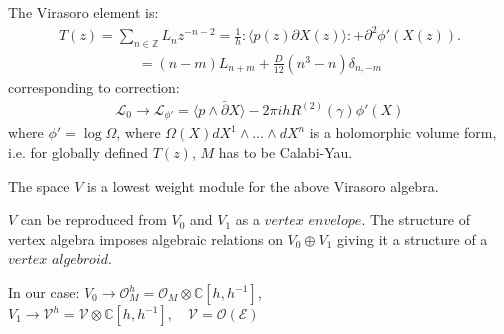 \documentclass[9pt]{beamer}
\newcommand{\p}{\partial}
\def\cE{\mathcal{E}}
\begin{document}
\begin{frame}
The Virasoro element is:
\begin{eqnarray*}
T(z)=\sum_{n\in \mathbb{Z}} L_n z^{-n-2}=\frac{1}{h}:\langle p(z)\p X(z)\rangle:+\p^2\phi'(X(z)).
\end{eqnarray*}
\begin{eqnarray*}
[L_n,L_m]=(n-m)L_{n+m}+\frac{D}{12}(n^3-n)\delta_{n,-m}
\end{eqnarray*}
 corresponding to correction:
\begin{eqnarray*}
\mathcal{L}_0\to \mathcal{L}_{\phi'}=\langle p\wedge\bar{\partial} X\rangle-2\pi i h R^{(2)}(\gamma)\phi'(X)
\end{eqnarray*}
where $\phi'=\log\Omega$, where $\Omega(X)dX^1\wedge \dots\wedge dX^n$ is a holomorphic volume form, i.e. for globally defined $T(z)$, $M$ has to 
be Calabi-Yau.

The space $V$ is a lowest weight module for the above Virasoro algebra. \\

\vspace*{2mm}

$V$ can be reproduced from $V_0$ and $V_1$ as a $vertex$ $envelope$.
The structure of vertex algebra imposes algebraic relations on $V_0\oplus V_1$ giving it a structure of a $vertex$ $algebroid$.

\vspace*{2mm}

In our case:
$V_0\to  \mathcal{O}_M^h=\mathcal{O}_M\otimes \mathbb{C}[h,h^{-1}]$,\\  
\hspace*{17mm}$V_1\to \mathcal{V}^h=\mathcal{V}\otimes \mathbb{C}[h, h^{-1}],\quad  \mathcal{V}=\mathcal{O}(\cE)$
\end{frame}
\end{document}
